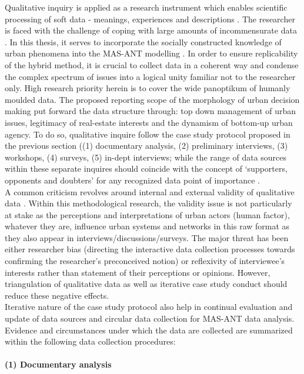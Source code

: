 \documentclass[11pt]{report}
\begin{document}
Qualitative inquiry is applied as a research instrument which enables scientific processing of soft data - meanings, experiences and descriptions . The researcher is faced with the challenge of coping with large amounts of incommensurate data . In this thesis, it serves to incorporate the socially constructed knowledge of urban phenomena into the MAS-ANT modelling . In order to ensure replicability of the hybrid method, it is crucial to collect data in a coherent way and condense the complex spectrum of issues into a logical unity familiar not to the researcher only. High research priority herein is to cover the wide panoptikum of humanly moulded data. The proposed reporting scope of the morphology of urban decision making put forward the data structure through: top down management of urban issues, legitimacy of real-estate interests and the dynamism of bottom-up urban agency. To do so, qualitative inquire follow the case study protocol proposed in the previous section ((1) documentary analysis, (2) preliminary interviews, (3) workshops, (4) surveys, (5) in-dept interviews; while the range of data sources within these separate inquires should coincide with the concept of ‘supporters, opponents and doubters’ for any recognized data point of importance . 
\\
A common criticism revolves around internal and external validity of qualitative data . Within this methodological research, the validity issue is not particularly at stake as the perceptions and interpretations of urban actors (human factor), whatever they are, influence urban systems and networks in this raw format as they also appear in interviews/discussions/surveys. The major threat has been either researcher bias (directing the interactive data collection processes  towards confirming the researcher's preconceived notion) or reflexivity of interviewee's interests rather than statement of their perceptions or opinions. However, triangulation of qualitative data as well as iterative case study conduct should reduce these negative effects.
\\
Iterative nature of the case study protocol also help in continual evaluation and update of data sources and circular data collection for MAS-ANT data analysis. Evidence and circumstances under which the data are collected are summarized within the following data collection procedures: 

\paragraph{(1) Documentary analysis}
\end{document}
